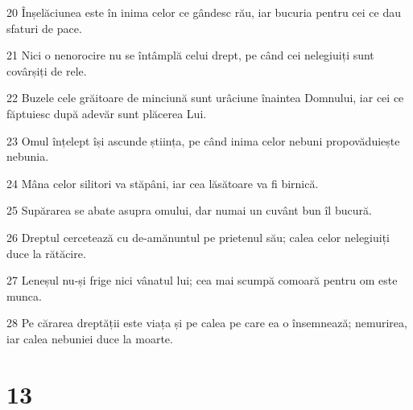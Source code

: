 \par 20 Înșelăciunea este în inima celor ce gândesc rău, iar bucuria pentru cei ce dau sfaturi de pace.
\par 21 Nici o nenorocire nu se întâmplă celui drept, pe când cei nelegiuiți sunt covârșiți de rele.
\par 22 Buzele cele grăitoare de minciună sunt urâciune înaintea Domnului, iar cei ce făptuiesc după adevăr sunt plăcerea Lui.
\par 23 Omul înțelept își ascunde știința, pe când inima celor nebuni propovăduiește nebunia.
\par 24 Mâna celor silitori va stăpâni, iar cea lăsătoare va fi birnică.
\par 25 Supărarea se abate asupra omului, dar numai un cuvânt bun îl bucură.
\par 26 Dreptul cercetează cu de-amănuntul pe prietenul său; calea celor nelegiuiți duce la rătăcire.
\par 27 Leneșul nu-și frige nici vânatul lui; cea mai scumpă comoară pentru om este munca.
\par 28 Pe cărarea dreptății este viața și pe calea pe care ea o însemnează; nemurirea, iar calea nebuniei duce la moarte.

\chapter{13}

